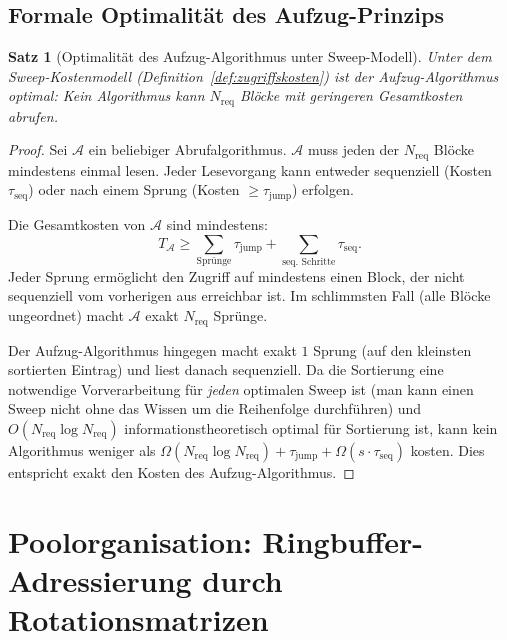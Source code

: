 ﻿\documentclass[a4paper,12pt]{article}
\theoremstyle{definition}
\theoremstyle{plain}
\newtheorem{satz}{Satz}[section]
\begin{document}
\subsection{Formale Optimalität des Aufzug-Prinzips}
\label{ssec:elevator_optimalitaet}

\begin{satz}[Optimalität des Aufzug-Algorithmus unter Sweep-Modell]
\label{satz:elevator_optimal}
  Unter dem Sweep-Kostenmodell (Definition~\ref{def:zugriffskosten})
  ist der Aufzug-Algorithmus optimal: Kein Algorithmus kann
  $N_{\mathrm{req}}$ Blöcke mit geringeren Gesamtkosten abrufen.
\end{satz}

\begin{proof}
  Sei $\mathcal{A}$ ein beliebiger Abrufalgorithmus.  $\mathcal{A}$ muss
  jeden der $N_{\mathrm{req}}$ Blöcke mindestens einmal lesen.  Jeder
  Lesevorgang kann entweder sequenziell (Kosten $\tau_{\mathrm{seq}}$) oder
  nach einem Sprung (Kosten $\ge \tau_{\mathrm{jump}}$) erfolgen.

  Die Gesamtkosten von $\mathcal{A}$ sind mindestens:
  \[
    T_\mathcal{A} \ge \sum_{\text{Sprünge}} \tau_{\mathrm{jump}}
                   + \sum_{\text{seq. Schritte}} \tau_{\mathrm{seq}}.
  \]
  Jeder Sprung ermöglicht den Zugriff auf mindestens einen Block, der
  nicht sequenziell vom vorherigen aus erreichbar ist.  Im schlimmsten Fall
  (alle Blöcke ungeordnet) macht $\mathcal{A}$ exakt $N_{\mathrm{req}}$
  Sprünge.

  Der Aufzug-Algorithmus hingegen macht exakt $1$ Sprung (auf den kleinsten
  sortierten Eintrag) und liest danach sequenziell.  Da die Sortierung eine
  notwendige Vorverarbeitung für \emph{jeden} optimalen Sweep ist (man
  kann einen Sweep nicht ohne das Wissen um die Reihenfolge durchführen)
  und $O(N_{\mathrm{req}} \log N_{\mathrm{req}})$ informationstheoretisch
  optimal für Sortierung ist, kann kein Algorithmus weniger als
  $\Omega(N_{\mathrm{req}} \log N_{\mathrm{req}}) + \tau_{\mathrm{jump}}
   + \Omega(s \cdot \tau_{\mathrm{seq}})$ kosten.  Dies entspricht exakt
  den Kosten des Aufzug-Algorithmus. 
\end{proof}

\section{Poolorganisation: Ringbuffer-Adressierung durch Rotationsmatrizen}
\label{sec:ringpool}
\end{document}
